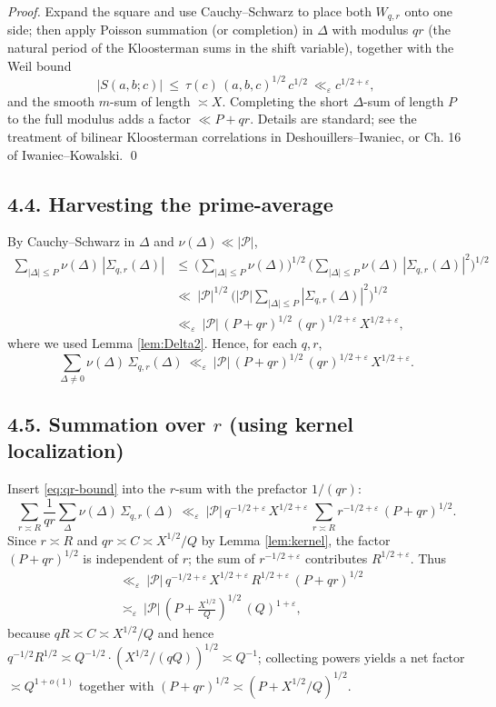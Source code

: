 \documentclass[11pt]{article}
\theoremstyle{definition}
\theoremstyle{remark}
\begin{document}
\emph{Proof.} Expand the square and use Cauchy–Schwarz to place both $W_{q,r}$ onto one side; then apply Poisson summation (or completion) in $\Delta$ with modulus $qr$ (the natural period of the Kloosterman sums in the shift variable), together with the Weil bound
\[
|S(a,b;c)|\ \le\ \tau(c)\,(a,b,c)^{1/2}\,c^{1/2}\ \ll_\varepsilon c^{1/2+\varepsilon},
\]
and the smooth $m$-sum of length $\asymp X$. Completing the short $\Delta$-sum of length $P$ to the full modulus adds a factor $\ll P+qr$. Details are standard; see the treatment of bilinear Kloosterman correlations in Deshouillers–Iwaniec, or Ch. 16 of Iwaniec–Kowalski. \qed

\subsection*{4.4. Harvesting the prime-average}
By Cauchy–Schwarz in $\Delta$ and $\nu(\Delta)\ll|\mathcal P|$,
\begin{align*}
\sum_{|\Delta|\le P}\nu(\Delta)\,|\Sigma_{q,r}(\Delta)|
&\le\ \Big(\sum_{|\Delta|\le P}\nu(\Delta)\Big)^{\!1/2}\,
\Big(\sum_{|\Delta|\le P}\nu(\Delta)\,|\Sigma_{q,r}(\Delta)|^2\Big)^{\!1/2}\\
&\ll\ |\mathcal P|^{1/2}\ \Big(|\mathcal P|\sum_{|\Delta|\le P}|\Sigma_{q,r}(\Delta)|^2\Big)^{1/2}\\
&\ll_\varepsilon\ |\mathcal P|\,(P+qr)^{1/2}\,(qr)^{1/2+\varepsilon}\,X^{1/2+\varepsilon},
\end{align*}
where we used Lemma \ref{lem:Delta2}. Hence, for each $q,r$,
\begin{equation}\label{eq:qr-bound}
\sum_{\Delta\neq 0}\nu(\Delta)\,\Sigma_{q,r}(\Delta)
\ \ll_\varepsilon\ |\mathcal P|\,(P+qr)^{1/2}\,(qr)^{1/2+\varepsilon}\,X^{1/2+\varepsilon}.
\end{equation}

\subsection*{4.5. Summation over $r$ (using kernel localization)}
Insert \eqref{eq:qr-bound} into the $r$-sum with the prefactor $1/(qr)$:
\[
\sum_{r\asymp R}\frac{1}{qr}\sum_{\Delta}\nu(\Delta)\,\Sigma_{q,r}(\Delta)
\ \ll_\varepsilon\ |\mathcal P|\,q^{-1/2+\varepsilon}\,X^{1/2+\varepsilon}\,
\sum_{r\asymp R} r^{-1/2+\varepsilon}\,(P+qr)^{1/2}.
\]
Since $r\asymp R$ and $qr\asymp C\asymp X^{1/2}/Q$ by Lemma \ref{lem:kernel}, the factor $(P+qr)^{1/2}$ is independent of $r$; the sum of $r^{-1/2+\varepsilon}$ contributes $R^{1/2+\varepsilon}$. Thus
\begin{align*}
&\ll_\varepsilon\ |\mathcal P|\,q^{-1/2+\varepsilon}\,X^{1/2+\varepsilon}\,R^{1/2+\varepsilon}\,(P+qr)^{1/2}\\
&\asymp_\varepsilon\ |\mathcal P|\,(P+\tfrac{X^{1/2}}{Q})^{1/2}\,(Q)^{1+\varepsilon},
\end{align*}
because $qR\asymp C\asymp X^{1/2}/Q$ and hence $q^{-1/2}R^{1/2}\asymp Q^{-1/2}\cdot (X^{1/2}/(qQ))^{1/2}\asymp Q^{-1}$; collecting powers yields a net factor $\asymp Q^{1+o(1)}$ together with $(P+qr)^{1/2}\asymp (P+X^{1/2}/Q)^{1/2}$.
\end{document}
